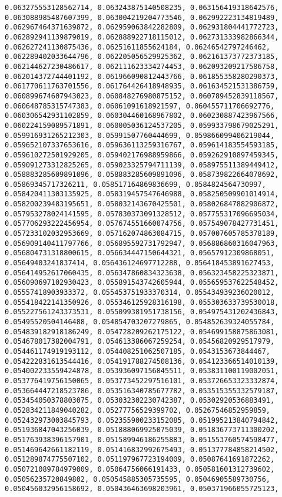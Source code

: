 \documentclass[11pt]{article}
\begin{document}
\begin{Verbatim}[commandchars=\\\{\}]
0.063275553128562714, 0.063243875140508235, 0.063156419318642576, 0.063088985487607399, 0.063004219204773546, 0.062992223134819489, 0.062967464371639872, 0.062959063842282809, 0.062931804441772723, 0.062892941139879019, 0.062888922718115012, 0.062731333982866344, 0.062627241130875436, 0.06251611855624184, 0.06246542797246462, 0.062289402033644796, 0.062205056529925362, 0.062161373772373185, 0.062144627230486617, 0.062111623334274453, 0.062093209217586758, 0.062014372744401192, 0.061966090812443766, 0.061855358280290373, 0.061770611763701556, 0.061764426418948935, 0.061634521531386759, 0.060899674607943023, 0.060848276980875152, 0.060789452839118567, 0.060648785315747383, 0.06061091618921597, 0.060455711706692776, 0.060306542931102859, 0.060304460168967802, 0.060230887423967566, 0.060224159089571891, 0.060005036124537205, 0.059933798679025291, 0.059916931265212303, 0.05991507760444699, 0.059866099406219044, 0.059652107337653616, 0.059636113259316767, 0.059614183554593185, 0.059610272501929205, 0.059402176988959866, 0.059262910897459345, 0.059091273312825265, 0.059023325794711139, 0.058975511389449412, 0.058883285609891096, 0.058883285609891096, 0.058739822664078692, 0.05869345717326211, 0.058517164869836699, 0.0584824564730997, 0.058420411303135925, 0.058319457547646988, 0.058250509901014914, 0.058200239483195651, 0.058032143670425501, 0.058026847882906872, 0.057953278024141595, 0.057830373091328512, 0.057755317096695034, 0.057706293222456954, 0.057674551660074756, 0.057549078427731451, 0.057233102032953669, 0.057162074863084715, 0.057007605785378189, 0.056909140411797766, 0.056895592731792947, 0.056886860316047963, 0.056804731318800615, 0.056634447150644321, 0.05657912309868051, 0.05649403241837414, 0.056436124697712288, 0.056418453891627453, 0.056414952617060435, 0.056347860834323638, 0.056323458225323871, 0.056090697102930423, 0.055891543742605944, 0.055659537622548452, 0.05557418903933372, 0.055453751933370314, 0.055434939236020012, 0.055418422141350926, 0.055346125928316198, 0.055303633739530018, 0.055227561243373531, 0.055099381951738156, 0.054975431202436843, 0.05495520504146488, 0.054854703207279865, 0.054852639324055784, 0.054839182918186249, 0.054728209262175122, 0.054699158875863081, 0.054678017382004791, 0.054613386067259254, 0.05456820929517979, 0.054461174919193112, 0.054408251062507185, 0.0543153673844467, 0.054222831613544416, 0.054191788274508136, 0.054123366514010139, 0.054002233559424878, 0.053936097156845511, 0.053831100119002051, 0.053776419756150065, 0.053773452297516101, 0.053726653323332874, 0.053664447218523786, 0.053516340785677782, 0.053515355332579187, 0.053454050378803075, 0.053032302230742387, 0.05302920536883491, 0.052834211849040282, 0.05277756529399702, 0.05267546852959859, 0.052432973003845793, 0.052355900233152085, 0.051995213840794842, 0.051936847043256039, 0.051888069925075039, 0.051836773711300202, 0.051763938396157901, 0.051589946186255883, 0.051553760574598477, 0.051469642661182119, 0.051416832992675493, 0.051377784858214502, 0.051289874775507102, 0.051197967723194009, 0.05087641691872262, 0.050721089784979009, 0.05064756066191433, 0.050581601312739602, 0.05056235720849802, 0.050545885305735595, 0.05046905589730756, 0.050456032956158692, 0.050436463698203961, 0.050371966055725123, 
\end{Verbatim}
\end{document}
